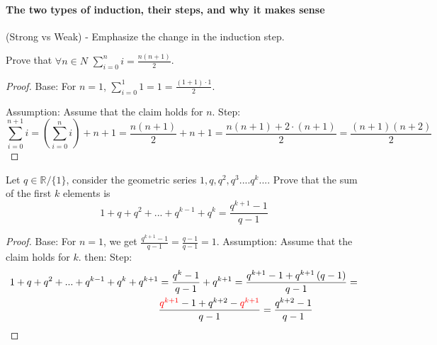 \paragraph{The two types of induction, their steps, and why it makes sense} (Strong vs Weak) - Emphasize the change in the induction step.
\begin{example} Prove that \( \forall n \in  N \)
\( \sum_{i=0}^{n}{i} = \frac{n(n+1)}{2} \).


\begin{proof} Base: For \(n = 1\), \(\sum_{i=0}^{1}{1} = 1 = \frac{(1+1)\cdot 1}{2} \).

Assumption: Assume that the claim holds for \(n\).
Step: 
\begin{equation*}
 \sum_{i=0}^{n+1}{i} = \left( \sum_{i=0}^{n}{i} \right) + n+1 = \frac{n(n+1)}{2} + n + 1 = \frac{n(n+1) + 2\cdot (n+1)}{2} = \frac{(n+1)(n+2)}{2} 
\end{equation*}
\end{proof}
\end{example}
\begin{example} Let \(q\in \mathbb{R} / \{1\}\), consider the geometric series \( 1,q,q^2,q^3....q^k...\). Prove that the sum of the first \(k\) elements is \begin{equation*}
     1+q+q^2+...+q^{k-1}+q^k = \frac{q^{k+1}-1}{q-1}
\end{equation*}

\begin{proof} Base: For \(n = 1\), we get \( \frac{q^{k+1}-1}{q-1} = \frac{q-1}{q-1} = 1\). 
Assumption: Assume that the claim holds for \(k\). then:
Step: 
\begin{equation*}
\begin{split}
    1+q+q^2+...+q^{k-1}+q^k + q^{k+1} &=  \frac{q^{k}-1}{q-1} + q^{k+1}  = \frac{q^{k+1}-1 +q^{k+1}\left(q-1\right) }{q-1} = \\ &\frac{\textcolor{red}{q^{k+1}}-1 +q^{k+2} - \textcolor{red}{q^{k+1}}  }{q-1} = \frac{q^{k+2}-1}{q-1} 
\end{split}
\end{equation*}
\end{proof}
\end{example}

